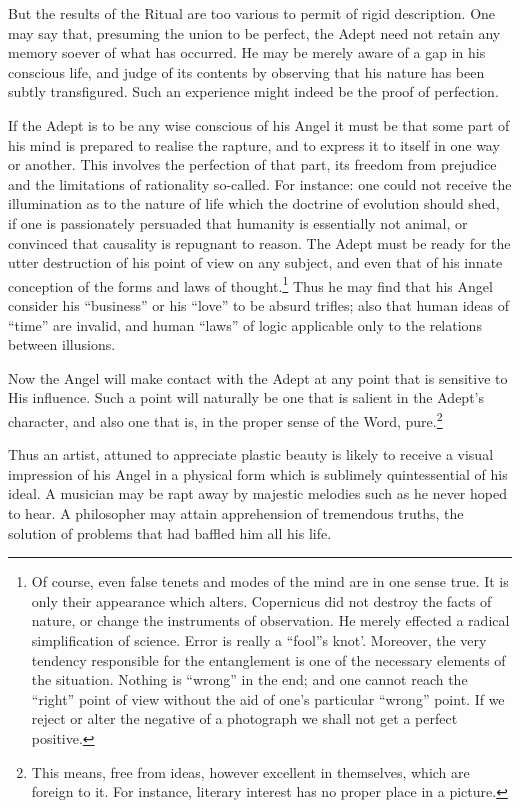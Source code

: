 But the results of the Ritual are too various to permit of rigid description. One may say that, presuming the union to be perfect, the Adept need not retain any memory soever of what has occurred. He may be merely aware of a gap in his conscious life, and judge of its contents by observing that his nature has been subtly transfigured. Such an experience might indeed be the proof of perfection.

If the Adept is to be any wise conscious of his Angel it must be that some part of his mind is prepared to realise the rapture, and to express it to itself in one way or another. This involves the perfection of that part, its freedom from prejudice and the limitations of rationality so-called. For instance: one could not receive the illumination as to the nature of life which the doctrine of evolution should shed, if one is passionately persuaded that humanity is essentially not animal, or convinced that causality is repugnant to reason. The Adept must be ready for the utter destruction of his point of view on any subject, and even that of his innate conception of the forms and laws of thought.\footnote{Of course, even false tenets and modes of the mind are in one sense true. It is only their appearance which alters. Copernicus did not destroy the facts of nature, or change the instruments of observation. He merely effected a radical simplification of science. Error is really a \enquote{fool}s knot'. Moreover, the very tendency responsible for the entanglement is one of the necessary elements of the situation. Nothing is \enquote{wrong} in the end; and one cannot reach the \enquote{right} point of view without the aid of one's particular \enquote{wrong} point. If we reject or alter the negative of a photograph we shall not get a perfect positive.} Thus he may find that his Angel consider his \enquote{business} or his \enquote{love} to be absurd trifles; also that human ideas of \enquote{time} are invalid, and human \enquote{laws} of logic applicable only to the relations between illusions.

Now the Angel will make contact with the Adept at any point that is sensitive to His influence. Such a point will naturally be one that is salient in the Adept's character, and also one that is, in the proper sense of the Word, pure.\footnote{This means, free from ideas, however excellent in themselves, which are foreign to it. For instance, literary interest has no proper place in a picture.}

Thus an artist, attuned to appreciate plastic beauty is likely to receive a visual impression of his Angel in a physical form which is sublimely quintessential of his ideal. A musician may be rapt away by majestic melodies such as he never hoped to hear. A philosopher may attain apprehension of tremendous truths, the solution of problems that had baffled him all his life.

